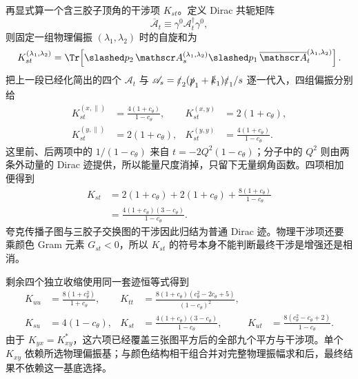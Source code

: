 \begin{derivation}[夸克与胶子散射的通道求和]
再显式算一个含三胶子顶角的干涉项 $K_{st}$。定义 Dirac 共轭矩阵
\begin{equation*}
 \overline{\mathscr A}_t
 \equiv\gamma^0\mathscr A_t^\dagger\gamma^0,
\end{equation*}
则固定一组物理偏振 $(\lambda_1,\lambda_2)$ 时的自旋和为
\begin{equation*}
 K_{st}^{(\lambda_1,\lambda_2)}
 =\Tr\!\left[
 \slashed p_2\,
 \mathscr A_s^{(\lambda_1,\lambda_2)}
 \slashed p_1\,
 \overline{\mathscr A}_t^{(\lambda_1,\lambda_2)}
 \right].
\end{equation*}
把上一段已经化简出的四个 $\mathscr A_t$ 与
$\mathscr A_s=\slashed\varepsilon_2(\slashed p_1+\slashed k_1)\slashed\varepsilon_1/s$
逐一代入，四组偏振分别给
\begin{align*}
 K_{st}^{(x,\parallel)}
 &=\frac{4(1+c_\theta)}{1-c_\theta},&
 K_{st}^{(x,y)}
 &=2(1+c_\theta),\\
 K_{st}^{(y,\parallel)}
 &=2(1+c_\theta),&
 K_{st}^{(y,y)}
 &=\frac{4(1+c_\theta)}{1-c_\theta}.
\end{align*}
这里前、后两项中的 $1/(1-c_\theta)$ 来自 $t=-2Q^2(1-c_\theta)$；分子中的 $Q^2$ 则由两条外动量的 Dirac 迹提供，所以能量尺度消掉，只留下无量纲角函数。四项相加便得到
\begin{align*}
 K_{st}
 &=2(1+c_\theta)
 +2(1+c_\theta)
 +\frac{8(1+c_\theta)}{1-c_\theta}\\
 &=\frac{4(1+c_\theta)(3-c_\theta)}{1-c_\theta}.
\end{align*}
夸克传播子图与三胶子交换图的干涉因此归结为普通 Dirac 迹。物理干涉项还要乘颜色 Gram 元素 $G_{st}<0$，所以 $K_{st}$ 的符号本身不能判断最终干涉是增强还是相消。

剩余四个独立收缩使用同一套迹恒等式得到
\begin{align*}
 K_{uu}&=\frac{8(1+c_\theta^2)}{1+c_\theta},&
 K_{tt}&=\frac{8(1+c_\theta)(c_\theta^2-2c_\theta+5)}{(1-c_\theta)^2},\\
 K_{su}&=4(1-c_\theta),&
 K_{st}&=\frac{4(1+c_\theta)(3-c_\theta)}{1-c_\theta},&
 K_{ut}&=\frac{8(c_\theta^2-c_\theta+2)}{1-c_\theta}.
\end{align*}
由于 $K_{yx}=K_{xy}^*$，这六项已经覆盖三张图平方后的全部九个平方与干涉项。单个 $K_{xy}$ 依赖所选物理偏振基；与颜色结构相干组合并对完整物理振幅求和后，最终结果不依赖这一基底选择。


\end{derivation}
